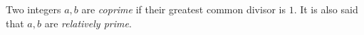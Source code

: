 \documentclass[12pt]{article}
\begin{document}
Two integers $a,b$ are \emph{coprime} if their greatest common divisor is $1$. It is also said that $a,b$ are \emph{relatively prime}.
\end{document}
